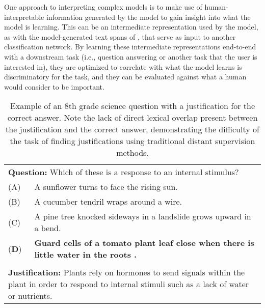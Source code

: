 One approach to interpreting complex models is to make use of human-interpretable information generated by the model to gain insight into what the model is learning.  This can be an intermediate representation used by the model, as with the model-generated text spans of \citet{Lei2016RationalizingNP}, that serve as input to another classification network.  
By learning these intermediate representations end-to-end with a downstream task (i.e., question answering or another task that the user is interested in), they are optimized to correlate with what the model learns is discriminatory for the task, and they can be evaluated against what a human would consider to be important.  


\begin{table}[t]
\begin{center}
\begin{tabularx}{\linewidth}{p{1cm}p{13cm}}
\multicolumn{2}{p{15cm}}{\textbf{Question:} Which of these is a response to an internal stimulus?} \\
 (A) & A sunflower turns to face the rising sun. \\
 (B) & A cucumber tendril wraps around a wire. \\
 (C) &  A pine tree knocked sideways in a landslide grows upward in a bend. \\
 (\textbf{D}) &\textbf{Guard cells of a tomato plant leaf close when there is little water in the roots .} \\
\\
\multicolumn{2}{p{15cm}}{\textbf{Justification:} 
Plants rely on hormones to send signals within the plant in order to respond to internal stimuli such as a lack of water or nutrients. } \\
\end{tabularx}

\caption{{  Example of an 8th grade science question with a justification for the correct answer.  Note the lack of direct lexical overlap present between the justification and the correct answer, demonstrating the difficulty of the task of finding justifications using traditional distant supervision methods. }}

\label{tab:question_example}
\end{center}
\end{table}

